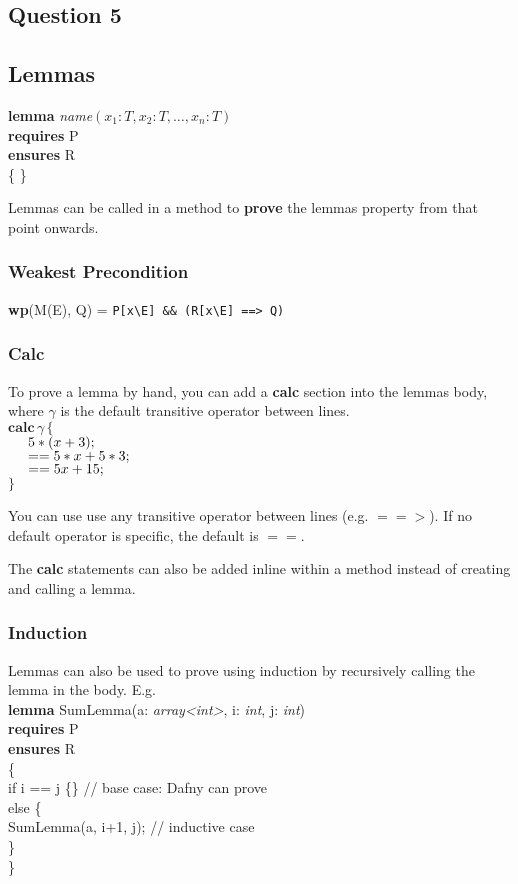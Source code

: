 \subsection{Question 5}

\subsection{Lemmas}
\textbf{lemma} \textit{name}$(x_1: \textit{T}, x_2: \textit{T}, \ldots, x_n: \textit{T})$ \\
        \tab \textbf{requires} P \\
        \tab \textbf{ensures} R \\
\{ \}

Lemmas can be called in a method to \textbf{prove} the lemmas property from that point onwards.

\subsubsection{Weakest Precondition}
\textbf{wp}(M(E), Q)  =  \verb!P[x\E] && (R[x\E] ==> Q)!

\subsubsection{Calc}
To prove a lemma by hand, you can add a \textbf{calc} section into the lemmas body, where \textit{$\gamma$} is the default transitive operator between lines. \\
$\textbf{calc} \, \textit{$\gamma$} \, \{$ \\
$\hspace*{0.5cm}    5*(x + 3);$ \\
$\hspace*{0.5cm} == 5*x + 5*3;$ \\
$\hspace*{0.5cm} == 5x + 15;$ \\
$\}$

You can use use any transitive operator between lines (e.g. $==>$). If no default operator is specific, the default is $==$.

The \textbf{calc} statements can also be added inline within a method instead of creating and calling a lemma.

\subsubsection{Induction}
Lemmas can also be used to prove using induction by recursively calling the lemma in the body. E.g. \\
\textbf{lemma} SumLemma(a: \textit{array<int>}, i: \textit{int}, j: \textit{int}) \\
        \tab \textbf{requires} P \\
        \tab \textbf{ensures} R \\
\{ \\
        \tab if i == j \{\} // base case: Dafny can prove\\
        \tab else \{\\
        \tab    \tab SumLemma(a, i+1, j); // inductive case\\
        \tab \}\\
\}

